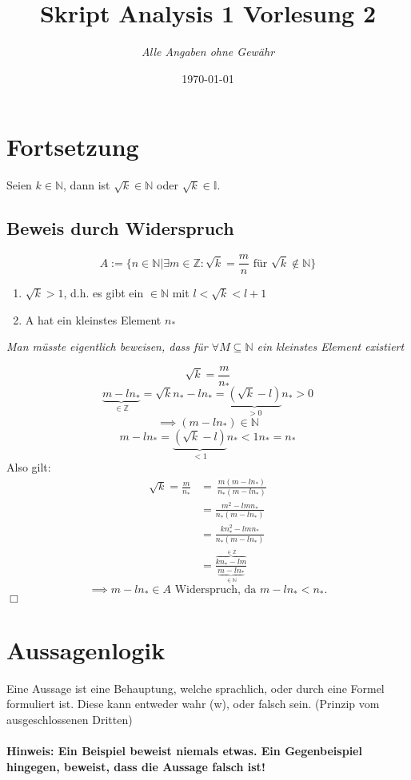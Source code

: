 \documentclass{article}
\title{Skript Analysis 1 Vorlesung 2} %
\author{\textit{Alle Angaben ohne Gewähr}} %
\date{\today} %
\begin{document}

	\maketitle %
    \section{Fortsetzung}
        Seien $k \in \mathbb{N}$, dann ist $\sqrt{k} \in \mathbb{N}$ oder $\sqrt{k} \in \mathbb{I}$.
        \subsection*{Beweis durch Widerspruch}
            $$A:=\{n\in\mathbb{N}|\exists m\in\mathbb{Z}: \sqrt{k}=\frac{m}{n} \text{ für } \sqrt{k} \notin \mathbb{N}\}$$
            \begin{enumerate}
                \item $\sqrt{k}>1$, d.h. es gibt ein $\in \mathbb{N}$ mit $l<\sqrt{k}<l+1$
                \item A hat ein kleinstes Element $n_*$
            \end{enumerate}
            \textit{Man müsste eigentlich beweisen, dass für $\forall M\subseteq \mathbb{N}$ ein kleinstes Element existiert}
            
             $$\sqrt{k}=\frac{m}{n_*}$$
             $$\underbrace{m-ln_*}_{\in \mathbb{Z}}=\sqrt{k}n_*-ln_*=\underbrace{(\sqrt{k}-l)}_{>0}n_*>0$$
             $$\implies (m-ln_*)\in \mathbb{N}$$
             $$m-ln_*=\underbrace{(\sqrt{k}-l)}_{<1}n_*<1n_*=n_*$$
             Also gilt:
            \begin{align*}
               \sqrt{k}=\frac{m}{n_*}&=\, \frac{m(m-ln_*)}{n_*(m-ln_*)}\\
               \,&=\frac{m^2-lmn_*}{n_*(m-ln_*)}\\
               \, &=\frac{kn_*^2-lmn_*}{n_*(m-ln_*)}\\
               \, &=\frac{\overbrace{kn_*-lm}^{\in \mathbb{Z}}}{\underbrace{m-ln_*}_{\in \mathbb{N}}}
            \end{align*}
            $$\implies m-ln_*\in A \text{ Widerspruch, da } m-ln_*<n_*.$$
            \hfill $\Box$

    \section{Aussagenlogik}
        Eine Aussage ist eine Behauptung, welche sprachlich, oder durch eine Formel formuliert ist. Diese kann entweder wahr (w), oder falsch sein. (Prinzip vom ausgeschlossenen Dritten)\\\\
        \textbf{Hinweis: Ein Beispiel beweist niemals etwas. Ein Gegenbeispiel hingegen, beweist, dass die Aussage falsch ist!}\\\
\end{document}
